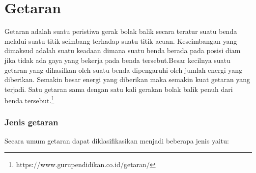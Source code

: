 \section{Getaran \cite{getaran}}
\label{sec:latex}
Getaran adalah suatu peristiwa gerak bolak balik secara teratur suatu benda melalui suatu titik seimbang terhadap suatu titik acuan. Keseimbangan yang dimaksud adalah suatu keadaan dimana suatu benda berada pada posisi diam jika tidak ada gaya yang bekerja pada benda tersebut.Besar kecilnya suatu getaran yang dihasilkan oleh suatu benda dipengaruhi oleh jumlah energi yang diberikan. Semakin besar energi yang diberikan maka semakin kuat getaran yang terjadi. Satu getaran sama dengan satu kali gerakan bolak balik penuh dari benda tersebut.\footnote{https://www.gurupendidikan.co.id/getaran/}

\subsubsection{Jenis getaran}
Secara umum getaran dapat diklasifikasikan menjadi beberapa jenis yaitu:
